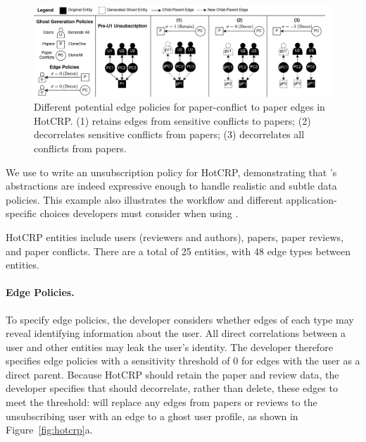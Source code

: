\begin{figure}[ht!]
    \centering
    \includegraphics[width=\textwidth]{img/pcs}

    \caption{Different potential edge policies for paper-conflict to paper edges in HotCRP.
    (1) retains edges from sensitive conflicts to papers; (2) decorrelates sensitive
    conflicts from papers; (3) decorrelates all conflicts from papers.}
    \label{fig:pcs}
\end{figure}

We use \sys to write an unsubscription policy for HotCRP, demonstrating that \sys's abstractions
are indeed expressive enough to handle realistic and subtle data policies.  This example also
illustrates the workflow and different application-specific choices developers must consider when
using \sys. 

HotCRP entities include users (reviewers and authors), papers, paper reviews, and
paper conflicts. There are a total of 25 entities, with 48 edge types between entities.

\paragraph{Edge Policies.} 
To specify edge policies, the developer considers whether edges of each type may reveal identifying
information about the user.  All direct correlations between a user and other entities may leak the
user's identity. The developer therefore specifies edge policies with a sensitivity threshold of 0
for edges with the user as a direct parent.  Because HotCRP should retain the paper and review data,
the developer specifies that \sys should decorrelate, rather than delete, these edges to meet the
threshold: \sys will replace any edges from papers or reviews to the unsubscribing user with an edge
to a ghost user profile, as shown in Figure~\ref{fig:hotcrp}a.

